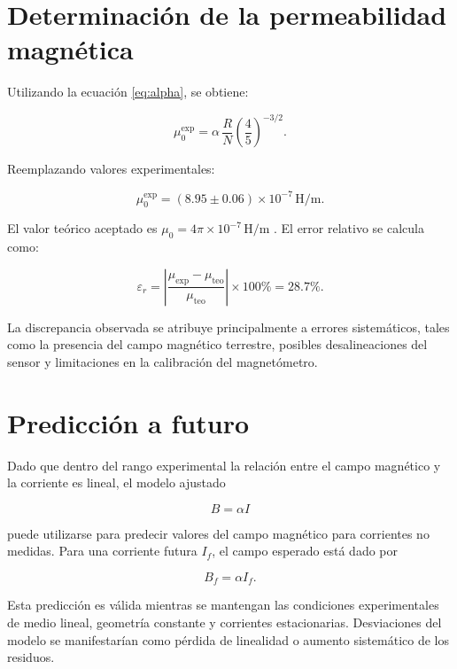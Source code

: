 \documentclass{article}
\begin{document}
\section*{Determinación de la permeabilidad magnética}

Utilizando la ecuación \eqref{eq:alpha}, se obtiene:

\begin{equation}
\mu_0^{\text{exp}} = \alpha\,\frac{R}{N}\left(\frac{4}{5}\right)^{-3/2}.
\end{equation}

Reemplazando valores experimentales:

\begin{equation}
\mu_0^{\text{exp}} = (8.95 \pm 0.06)\times 10^{-7}\,\text{H/m}.
\end{equation}

El valor teórico aceptado es $\mu_0 = 4\pi \times 10^{-7}\,\text{H/m}$ \cite{Griffiths}. El
error relativo se calcula como:

\begin{equation}
\varepsilon_r =
\left|
\frac{\mu_{\text{exp}} - \mu_{\text{teo}}}{\mu_{\text{teo}}}
\right| \times 100\% = 28.7\%.
\end{equation}

La discrepancia observada se atribuye principalmente a errores sistemáticos, tales como la
presencia del campo magnético terrestre, posibles desalineaciones del sensor y limitaciones
en la calibración del magnetómetro.

\section*{Predicción a futuro}

Dado que dentro del rango experimental la relación entre el campo magnético y la corriente
es lineal, el modelo ajustado

\begin{equation}
B = \alpha I
\end{equation}

puede utilizarse para predecir valores del campo magnético para corrientes no medidas. Para
una corriente futura $I_f$, el campo esperado está dado por

\begin{equation}
B_f = \alpha I_f.
\end{equation}

Esta predicción es válida mientras se mantengan las condiciones experimentales de medio
lineal, geometría constante y corrientes estacionarias. Desviaciones del modelo se
manifestarían como pérdida de linealidad o aumento sistemático de los residuos.
\end{document}
